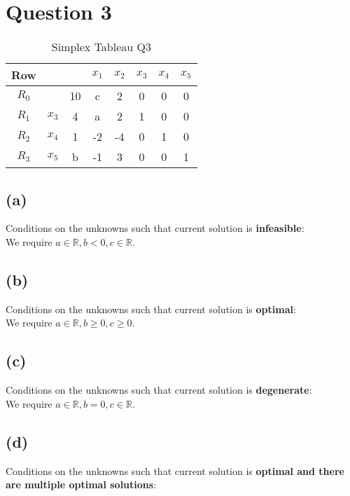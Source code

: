 \documentclass[12pt]{article}
\begin{document}
\newpage

\section*{Question 3}

\begin{table}[H]
    \centering
    \begin{tabular}{c | c c | c c c c c}
        Row & & & $x_{1}$ & $x_{2}$ & $x_{3}$ & $x_{4}$ & $x_{5}$ \\ \hline 
        $R_{0}$ & & 10 & c & 2 & 0 & 0 & 0 \\ \hline
        $R_{1}$ & $x_{3}$ & 4 & a & 2 & 1 & 0 & 0 \\ 
        $R_{2}$ & $x_{4}$ & 1 & -2 & -4 & 0 & 1 & 0 \\
        $R_{3}$ & $x_{5}$ & b & -1 & 3 & 0 & 0 & 1 \\ 
    \end{tabular}
    \caption{Simplex Tableau Q3}
    \label{tab: 3-tableau1}
\end{table}

\subsection*{(a)}
Conditions on the unknowns such that current solution is \textbf{infeasible}: \\ 

\noindent We require $a \in \mathbb{R}, b < 0, c \in \mathbb{R}$.

\subsection*{(b)}
Conditions on the unknowns such that current solution is \textbf{optimal}: \\ 

\noindent We require $a \in \mathbb{R}, b \geq 0, c\geq 0$.

\subsection*{(c)}
Conditions on the unknowns such that current solution is \textbf{degenerate}: \\ 

\noindent We require $a \in \mathbb{R}, b = 0, c \in \mathbb{R}$.

\subsection*{(d)}
Conditions on the unknowns such that current solution is \textbf{optimal and there are multiple optimal solutions}: \\ 
\end{document}
